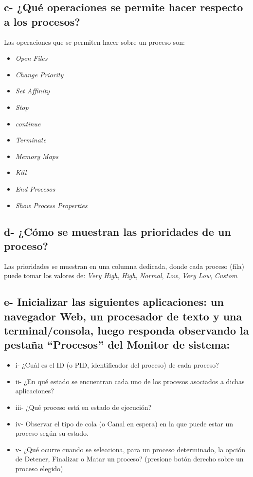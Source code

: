 \documentclass{article}
\begin{document}
\subsection*{c- ¿Qué operaciones se permite hacer respecto a los procesos?}
Las operaciones que se permiten hacer sobre un proceso son:
\begin{itemize}
  \item \textit{Open Files}
  \item \textit{Change Priority}
  \item \textit{Set Affinity}
  \item \textit{Stop}
  \item \textit{continue}
  \item \textit{Terminate}
  \item \textit{Memory Maps}
  \item \textit{Kill}
  \item \textit{End Procesos}
  \item \textit{Show Process Properties}
\end{itemize}

\subsection*{d- ¿Cómo se muestran las prioridades de un proceso?}

Las prioridades se muestran en una columna dedicada, donde cada proceso (fila) puede tomar los valores de: \textit{Very High}, \textit{High}, \textit{Normal}, 
\textit{Low}, \textit{Very Low}, \textit{Custom}

\subsection*{e- Inicializar las siguientes aplicaciones: un navegador Web, un procesador de texto y una
terminal/consola, luego responda observando la pestaña “Procesos” del Monitor de sistema:}

\begin{itemize}
    \item i- ¿Cuál es el ID (o PID, identificador del proceso) de cada proceso?
    \item ii- ¿En qué estado se encuentran cada uno de los procesos asociados a dichas aplicaciones?
    \item iii- ¿Qué proceso está en estado de ejecución?
    \item iv- Observar el tipo de cola (o Canal en espera) en la que puede estar un proceso según su
        estado.
    \item v- ¿Qué ocurre cuando se selecciona, para un proceso determinado, la opción de Detener,
        Finalizar o Matar un proceso? (presione botón derecho sobre un proceso elegido)
\end{itemize}
\end{document}
